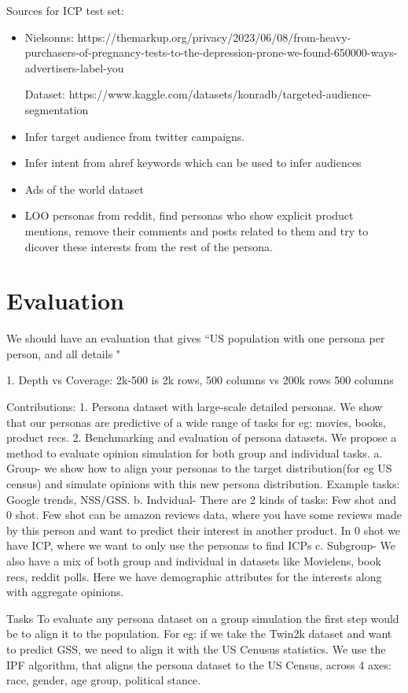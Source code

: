 Sources for ICP test set:
\begin{itemize}
    \item Nielsonns: https://themarkup.org/privacy/2023/06/08/from-heavy-purchasers-of-pregnancy-tests-to-the-depression-prone-we-found-650000-ways-advertisers-label-you

    Dataset: https://www.kaggle.com/datasets/konradb/targeted-audience-segmentation

    \item Infer target audience from twitter campaigns. 
    \item Infer intent from ahref keywords which can be used to infer audiences
    \item Ads of the world dataset
    \item LOO personas from reddit, find personas who show explicit product mentions, remove their comments and posts related to them and try to dicover these interests from the rest of the persona.
\end{itemize}

\section{Evaluation}
We should have an evaluation that gives
``US population with one persona per person, and all details "




1. Depth vs Coverage: 2k-500 is 2k rows, 500 columns vs 200k rows 500 columns

Contributions:
1. Persona dataset with large-scale  detailed personas. We show that our personas are predictive of a wide range of tasks for eg: movies, books, product recs.
2. Benchmarking and evaluation of persona datasets. We propose a method to evaluate opinion simulation for both group and individual tasks. 
a. Group- we show how to align your personas to the target distribution(for eg US census) and simulate opinions with this new persona distribution. Example tasks: Google trends, NSS/GSS.
b. Indvidual- There are 2 kinds of tasks: Few shot and 0 shot. Few shot can be amazon reviews data, where you have some reviews made by this person and want to predict their interest in another product. In 0 shot we have ICP, where we want to only use the personas to find ICPs
c. Subgroup- We also have a mix of both group and individual in datasets like Movielens, book recs, reddit polls. Here we have demographic attributes for the interests along with aggregate opinions.


Tasks
To evaluate any persona dataset on a group simulation the first step would be to align it to the population. For eg: if we take the Twin2k dataset and want to predict GSS, we need to align it with the US Cenusus statistics. We use the IPF algorithm, that aligns the persona dataset to the US Census, across 4 axes: race, gender, age group, political stance.  
